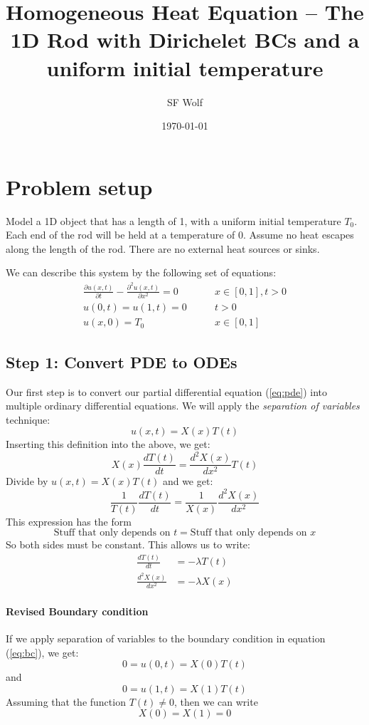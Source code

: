 \documentclass{article}
\title{Homogeneous Heat Equation -- The 1D Rod with Dirichelet BCs and a uniform initial temperature}
\author{SF Wolf}
\date{\today}
\begin{document}
\maketitle

\section{Problem setup}

Model a 1D object that has a length of 1, with a uniform initial temperature $T_0$. Each end of
the rod will be held at a temperature of 0. Assume no heat escapes along the length of the
rod. There are no external heat sources or sinks.

We can describe this system by the following set of equations:
\begin{align}
  \frac{\partial u(x,t)}{\partial t} - \frac{\partial^2 u(x,t)}{\partial x^2} = 0
  & \qquad x\in[0,1], t>0 \label{eq:pde}\\
  u(0,t) = u(1,t) = 0   & \qquad t>0 \label{eq:bc}\\
  u(x,0) = T_0   & \qquad x\in[0,1] \label{eq:ic}
\end{align}

\subsection{Step 1: Convert PDE to ODEs}
Our first step is to convert our partial differential equation (\ref{eq:pde}) into multiple
ordinary differential equations. We will apply the \textit{separation of variables} technique:
\begin{equation}
  \label{eq:sepVar}
  u(x,t) = X(x) T(t)
\end{equation}
Inserting this definition into the above, we get:
\[
  X(x)\frac{dT(t)}{dt} = \frac{d^2X(x)}{dx^2} T(t)
\]
Divide by $u(x,t) = X(x) T(t)$ and we get:
\[
  \frac{1}{T(t)}\frac{dT(t)}{dt} = \frac{1}{X(x)} \frac{d^2X(x)}{dx^2}
\]
This expression has the form
\[
  \text{Stuff that only depends on } t = \text{Stuff that only depends on } x
\]
So both sides must be constant. This allows us to write:
\begin{align}
  \frac{dT(t)}{dt} &= -\lambda T(t) \label{eq:ode1} \\
  \frac{d^2X(x)}{dx^2} &= -\lambda X(x) \label{eq:ode2}
\end{align}

\paragraph{Revised Boundary condition}
If we apply separation of variables to the boundary condition in equation (\ref{eq:bc}), we
get:
\[
  0 = u(0,t) = X(0) T(t)
\]
and
\[
  0 = u(1,t) = X(1) T(t)
\]
Assuming that the function $T(t)\neq 0$, then we can write
\begin{equation}
  \label{eq:newbc}
  X(0) = X(1) = 0
\end{equation}
\end{document}
